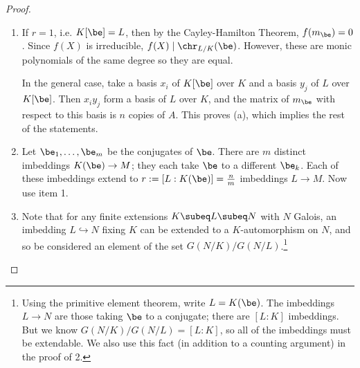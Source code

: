 \begin{proof}$\,$
\begin{enumerate}
\item If $r=1$, i.e. $K[\be]=L$, then by the Cayley-Hamilton Theorem, $f(m_{\be})=0$. Since $f(X)$ is irreducible, $f(X)\mid \chr_{L/K}(\be)$. However, these are monic polynomials of the same degree so they are equal. 

In the general case, take a basis $x_i$ of $K[\be]$ over $K$ and a basis $y_j$ of $L$ over $K[\be]$. Then $x_iy_j$ form a basis of $L$ over $K$, and the matrix of $m_{\be}$ with respect to this basis is $n$ copies of $A$. This proves (a), which implies the rest of the statements.
%
\item
Let $\be_1,\ldots, \be_m$ be the conjugates of $\be$. There are $m$ distinct imbeddings $K(\be)\to M$; they each take $\be$ to a different $\be_k$. Each of these imbeddings extend to $r:=[L:K(\be)]=\frac{n}{m}$ imbeddings $L\to M$. %
Now use item 1.
\item Note that for any finite extensions $K\subeq L\subeq N$ with $N$ Galois, an imbedding $L\hookrightarrow N$ fixing $K$ can be extended to a $K$-automorphism on $N$, and so be considered an element of the set $G(N/K)/G(N/L)$.\footnote{Using the primitive element theorem, write $L=K(\be)$. The imbeddings $L\to N$ are those taking $\be$ to a conjugate; there are $[L:K]$ imbeddings. But we know $G(N/K)/G(N/L)=[L:K]$, so all of the imbeddings must be extendable. We also use this fact (in addition to a counting argument) in the proof of 2.}


\end{enumerate}
\end{proof}
